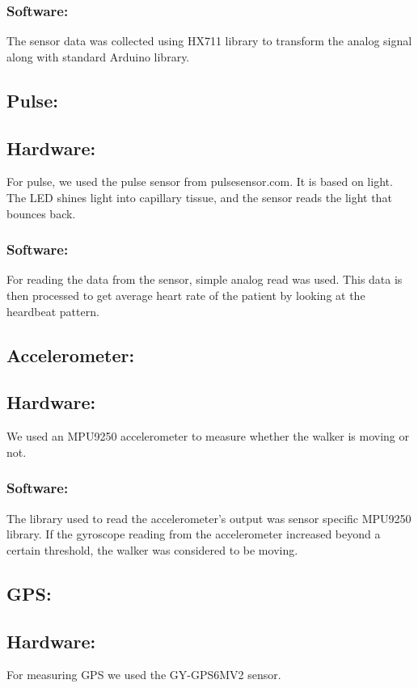 \subsubsection{Software:}
The sensor data was collected using HX711 library to transform the analog signal along with standard Arduino library. 

\subsection{Pulse:}

\subsection{Hardware:}
For pulse, we used the pulse sensor from pulsesensor.com. It is based on light. The LED shines light into capillary tissue, and the sensor reads the light that bounces back.

\subsubsection{Software:}
For reading the data from the sensor, simple analog read was used. This data is then processed to get average heart rate of the patient by looking at the heardbeat pattern.

\subsection{Accelerometer:}

\subsection{Hardware:}
We used an MPU9250 accelerometer to measure whether the walker is moving or not.

\subsubsection{Software:}
The library used to read the accelerometer's output was sensor specific MPU9250 library. If the gyroscope reading from the accelerometer increased beyond a certain threshold, the walker was considered to be moving.

\subsection{GPS:}

\subsection{Hardware:}
For measuring GPS we used the GY-GPS6MV2 sensor.


